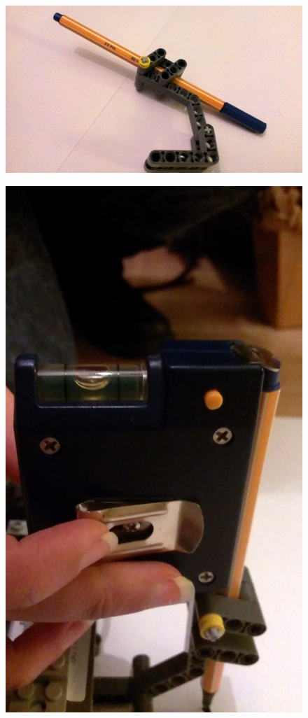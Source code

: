 \documentclass{scrartcl}
\begin{document}
\begin{figure}
\centering
\begin{minipage}{.5\textwidth}
  \centering
  \includegraphics[width=.5\linewidth]{img/pen.jpg}
  \label{fig:pen}
\end{minipage}%
\begin{minipage}{.5\textwidth}
  \centering
  \includegraphics[width=.5\linewidth]{img/pen_adjust.jpg}
  \label{fig:pen_calib}
\end{minipage}
\end{figure}
\end{document}
